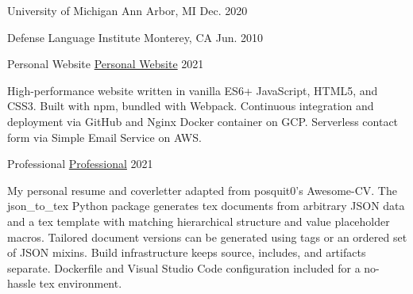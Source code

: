 \documentclass[11pt, a4paper]{cv}
\begin{document}
\begin{cv}
\begin{experience}
\end{experience}
\begin{education}
\begin{cventries}
\cventry
{\begin{degrees}
\end{degrees}}
{University of Michigan}
{Ann Arbor, MI}
{Dec. 2020}
{\begin{cvitems}
\end{cvitems}}
\cventry
{\begin{degrees}
\end{degrees}}
{Defense Language Institute}
{Monterey, CA}
{Jun. 2010}
{\begin{cvitems}
\end{cvitems}}
\end{cventries}
\end{education}
\begin{projects}
\begin{cventries}
\cventrycompact
{
{Personal Website}
{\color{hrefblue}\href{https://brandon.mosher.xyz}{Personal Website}}}
{}
{}
{2021}
{\begin{cvparagraph}
High-performance website written in vanilla ES6+ JavaScript, HTML5, and CSS3. Built with npm, bundled with Webpack. Continuous integration and deployment via GitHub and Nginx Docker container on GCP. Serverless contact form via Simple Email Service on AWS.
\end{cvparagraph}}
\cventrycompact
{
{Professional}
{\color{hrefblue}\href{https://github.com/brandonmosher/professional}{Professional}}}
{}
{}
{2021}
{\begin{cvparagraph}
My personal resume and coverletter adapted from posquit0's Awesome-CV. The json\_to\_tex Python package generates tex documents from arbitrary JSON data and a tex template with matching hierarchical structure and value placeholder macros. Tailored document versions can be generated using tags or an ordered set of JSON mixins. Build infrastructure keeps source, includes, and artifacts separate. Dockerfile and Visual Studio Code configuration included for a no-hassle tex environment.

\end{cvparagraph}}
\end{cventries}
\end{projects}
\end{cv}
\end{document}
